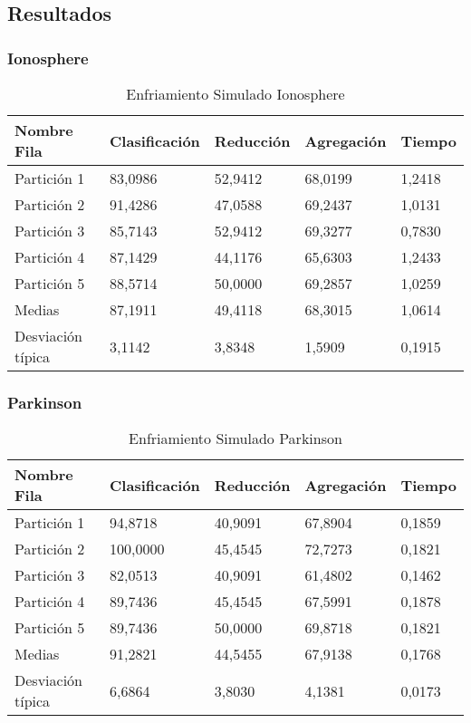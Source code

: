 \subsection{Resultados}
\subsubsection{Ionosphere}
\begin{table}[H]
  \centering
  \caption{Enfriamiento Simulado Ionosphere} 
  \begin{tabular}{|l|l|l|l|l|}
  \hline
      Nombre Fila & Clasificación & Reducción & Agregación & Tiempo \\ \hline
      Partición 1 & 83,0986 & 52,9412 & 68,0199 & 1,2418 \\ \hline
      Partición 2 & 91,4286 & 47,0588 & 69,2437 & 1,0131 \\ \hline
      Partición 3 & 85,7143 & 52,9412 & 69,3277 & 0,7830 \\ \hline
      Partición 4 & 87,1429 & 44,1176 & 65,6303 & 1,2433 \\ \hline
      Partición 5 & 88,5714 & 50,0000 & 69,2857 & 1,0259 \\ \hline
      Medias  & 87,1911 & 49,4118 & 68,3015 & 1,0614 \\ \hline
      Desviación típica & 3,1142 & 3,8348 & 1,5909 & 0,1915 \\ \hline
  \end{tabular}
  \label{enfriamiento-simulado-ionosfere}
\end{table}
\subsubsection{Parkinson}
\begin{table}[H]
  \centering
  \caption{Enfriamiento Simulado Parkinson}
  \begin{tabular}{|l|l|l|l|l|}
  \hline
      Nombre Fila & Clasificación & Reducción & Agregación & Tiempo \\ \hline
      Partición 1 & 94,8718 & 40,9091 & 67,8904 & 0,1859 \\ \hline
      Partición 2 & 100,0000 & 45,4545 & 72,7273 & 0,1821 \\ \hline
      Partición 3 & 82,0513 & 40,9091 & 61,4802 & 0,1462 \\ \hline
      Partición 4 & 89,7436 & 45,4545 & 67,5991 & 0,1878 \\ \hline
      Partición 5 & 89,7436 & 50,0000 & 69,8718 & 0,1821 \\ \hline
      Medias  & 91,2821 & 44,5455 & 67,9138 & 0,1768 \\ \hline
      Desviación típica & 6,6864 & 3,8030 & 4,1381 & 0,0173 \\ \hline
  \end{tabular}
  \label{enfriamiento-simulado-Parkinson}
\end{table}
